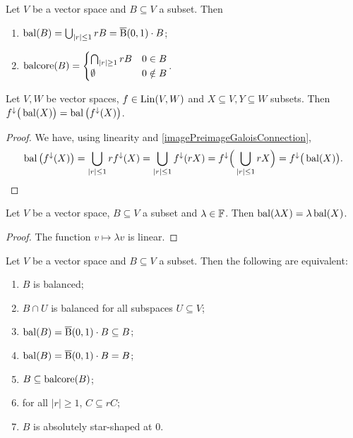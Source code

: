 \begin{lemma} \label{balancedClosures}
Let $V$ be a vector space and $B\subseteq V$ a subset. Then
\begin{enumerate}
\item $\operatorname{bal}(B) = \bigcup_{|r|\leq 1}rB = \operatorname{\overline{B}}(0,1)\cdot B$;
\item $\operatorname{balcore}(B) = \begin{cases}
\bigcap_{|r|\geq 1}rB & 0\in B\\
\emptyset & 0\notin B
\end{cases}$.
\end{enumerate}
\end{lemma}
\begin{corollary} \label{linearFunctionsPreserveBalancedHull}
Let $V,W$ be vector spaces, $f\in \operatorname{Lin}(V,W)$ and $X\subseteq V, Y\subseteq W$ subsets. Then $f^\downarrow\big(\operatorname{bal}(X)\big) = \operatorname{bal}\big(f^\downarrow(X)\big)$.
\end{corollary}
\begin{proof}
We have, using linearity and \ref{imagePreimageGaloisConnection},
\[ \operatorname{bal}\big(f^\downarrow(X)\big) = \bigcup_{|r|\leq 1}rf^{\downarrow}(X) = \bigcup_{|r|\leq 1}f^{\downarrow}(rX) = f^{\downarrow}\Big(\bigcup_{|r|\leq 1}rX\Big) = f^{\downarrow}\big(\operatorname{bal}(X)\big). \]
\end{proof}
\begin{corollary} \label{balancedHullHomogeneous}
Let $V$ be a vector space, $B\subseteq V$ a subset and $\lambda\in \mathbb{F}$. Then $\operatorname{bal}(\lambda X) = \lambda \operatorname{bal}(X)$.
\end{corollary}
\begin{proof}
The function $v\mapsto \lambda v$ is linear.
\end{proof}

\begin{lemma}
Let $V$ be a vector space and $B\subseteq V$ a subset. Then the following are equivalent:
\begin{enumerate}
\item $B$ is balanced;
\item $B\cap U$ is balanced for all subspaces $U\subseteq V$;
\item $\operatorname{bal}(B) = \operatorname{\overline{B}}(0,1)\cdot B \subseteq B$;
\item $\operatorname{bal}(B) = \operatorname{\overline{B}}(0,1)\cdot B = B$;
\item $B\subseteq \operatorname{balcore}(B)$;
\item for all $|r|\geq 1$, $C\subseteq rC$;
\item $B$ is absolutely star-shaped at $0$.
\end{enumerate}
\end{lemma}

